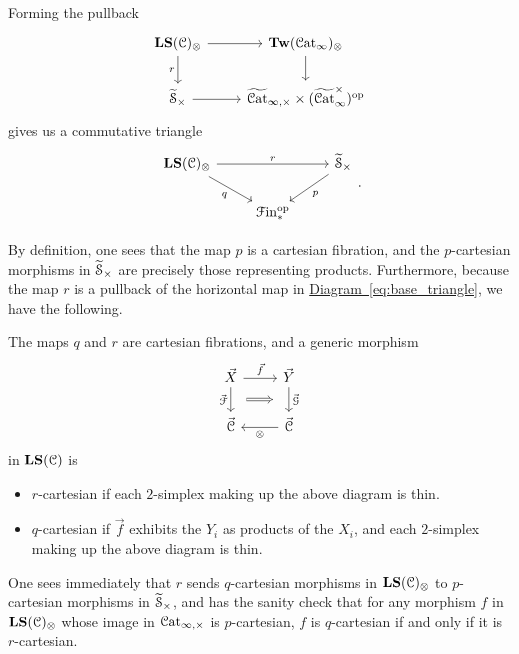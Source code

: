 \documentclass[main.tex]{subfiles}
\begin{document}
Forming the pullback
\begin{equation*}
  \begin{tikzcd}
    \LS(\category{C})_{\otimes}
    \arrow[r]
    \arrow[d, swap, "r"]
    & \Tw(\ICat)_{\otimes}
    \arrow[d]
    \\
    \TSCart
    \arrow[r]
    & \TICatCart \times (\TICatCocart)\op
  \end{tikzcd}
\end{equation*}
gives us a commutative triangle
\begin{equation*}
  \begin{tikzcd}
    \LS(\category{C})_{\otimes}
    \arrow[rr, "r"]
    \arrow[dr, swap, "q"]
    && \TSCart
    \arrow[dl, "p"]
    \\
    & \Finp\op
  \end{tikzcd}.
\end{equation*}

By definition, one sees that the map $p$ is a cartesian fibration, and the $p$-cartesian morphisms in $\widetilde{\mathcal{S}}_{\times}$ are precisely those representing products. Furthermore, because the map $r$ is a pullback of the horizontal map in \hyperref[eq:base_triangle]{Diagram~\ref*{eq:base_triangle}}, we have the following.

\begin{proposition}
  The maps $q$ and $r$ are cartesian fibrations, and a generic morphism
  \begin{equation*}
    \begin{tikzcd}
      \vec{X}
      \arrow[r, "\vec{f}"]
      \arrow[d, ""{name=L, right}, "\vec{\mathcal{F}}"{left}]
      & \vec{Y}
      \arrow[d, ""{name=R, left}, "\vec{\mathcal{G}}"{right}]
      \\
      \vec{\category{C}}
      & \vec{\category{C}}
      \arrow[l, "\otimes"]
      \arrow[Rightarrow, from=L, to=R, shorten=1.5ex]
    \end{tikzcd}
  \end{equation*}
  in $\mathbf{LS}(\mathcal{C})$ is
  \begin{itemize}
    \item $r$-cartesian if each $2$-simplex making up the above diagram is thin.

    \item $q$-cartesian if $\vec{f}$ exhibits the $Y_{i}$ as products of the $X_{i}$, and each $2$-simplex making up the above diagram is thin.
  \end{itemize}
\end{proposition}
One sees immediately that $r$ sends $q$-cartesian morphisms in $\mathbf{LS}(\mathcal{C})_{\otimes}$ to $p$-cartesian morphisms in $\widetilde{\mathcal{S}}_{\times}$, and has the sanity check that for any morphism $f$ in $\mathbf{LS}(\mathcal{C})_{\otimes}$ whose image in $\mathcal{C}\mathrm{at}_{\infty,\times}$ is $p$-cartesian, $f$ is $q$-cartesian if and only if it is $r$-cartesian.
\end{document}
